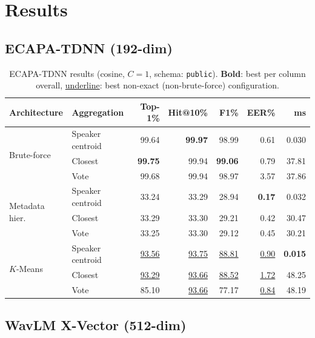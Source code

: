 \documentclass[12pt, a4paper]{article}
\newcommand{\code}[1]{\texttt{#1}}
\begin{document}
\section{Results}
\label{sec:results}

\subsection{ECAPA-TDNN (192-dim)}
\label{sec:results_ecapa}

\begin{table}[H]
\centering
\caption{ECAPA-TDNN results (cosine, $C{=}1$, schema: \code{public}).
  \textbf{Bold}: best per column overall,
  \underline{underline}: best non-exact (non-brute-force) configuration.}
\label{tab:results_ecapa}
\setlength{\tabcolsep}{4pt}
\begin{tabular}{llrrrrr}
\toprule
\textbf{Architecture} & \textbf{Aggregation} &
\textbf{Top-1\%} & \textbf{Hit@10\%} &
\textbf{F1\%} & \textbf{EER\%} & \textbf{ms} \\
\midrule
\multirow{3}{*}{Brute-force}
  & Speaker centroid & 99.64 & \textbf{99.97} & 98.99 & 0.61 & 0.030 \\
  & Closest          & \textbf{99.75} & 99.94 & \textbf{99.06} & 0.79 & 37.81 \\
  & Vote             & 99.68 & 99.94 & 98.97 & 3.57 & 37.86 \\
\midrule
\multirow{3}{*}{Metadata hier.}
  & Speaker centroid & 33.24 & 33.29 & 28.94 & \textbf{0.17} & 0.032 \\
  & Closest          & 33.29 & 33.30 & 29.21 & 0.42 & 30.47 \\
  & Vote             & 33.25 & 33.30 & 29.12 & 0.45 & 30.21 \\
\midrule
\multirow{3}{*}{$K$-Means}
  & Speaker centroid & \underline{93.56} & \underline{93.75} & \underline{88.81} & \underline{0.90} & \textbf{0.015} \\
  & Closest          & \underline{93.29} & \underline{93.66} & \underline{88.52} & \underline{1.72} & 48.25 \\
  & Vote             & 85.10 & \underline{93.66} & 77.17 & \underline{0.84} & 48.19 \\
\bottomrule
\end{tabular}
\end{table}

\subsection{WavLM X-Vector (512-dim)}
\label{sec:results_wavlm_xvec}
\end{document}
